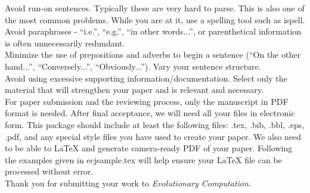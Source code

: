\documentclass[twoside]{article}
\begin{document}
Avoid run-on sentences.  Typically these are very hard to parse. This is 
also one of the most common problems. While you are at it, use a spelling 
tool such as ispell.\\

Avoid paraphrases - ``i.e.'', ``e.g.'', ``in other words...'', or 
parenthetical information is often unnecessarily redundant.\\

Minimize the use of prepositions and adverbs to begin a sentence (``On the other hand...'', ``Conversely...'', ``Obviously...'').  Vary your sentence 
structure.\\

Avoid using excessive supporting information/documentation.  Select only the 
material that will strengthen your paper and is relevant and necessary.\\

For paper submission and the reviewing process, only the manuscript in 
PDF format is needed. After final acceptance, we will need all your files 
in electronic form.  This package should include at least the following 
files:  .tex, .bib, .bbl, .eps, .pdf, and any 
special style files you have used to create your paper.  We also need to be 
able to \LaTeX{} and generate camera-ready PDF of your paper. Following 
the examples given in ecjsample.tex will help ensure your \LaTeX{} file can be 
processed without error.\\ 

Thank you for submitting your work to {\em Evolutionary Computation}.

\small



\end{document}
